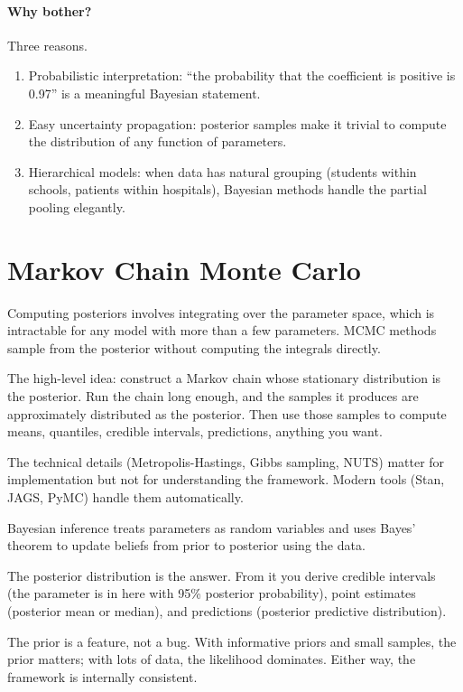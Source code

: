 \paragraph{Why bother?} Three reasons.
\begin{enumerate}[noitemsep]
\item Probabilistic interpretation: ``the probability that the coefficient is positive is 0.97'' is a meaningful Bayesian statement.
\item Easy uncertainty propagation: posterior samples make it trivial to compute the distribution of any function of parameters.
\item Hierarchical models: when data has natural grouping (students within schools, patients within hospitals), Bayesian methods handle the partial pooling elegantly.
\end{enumerate}

\section{Markov Chain Monte Carlo}

Computing posteriors involves integrating over the parameter space, which is intractable for any model with more than a few parameters. MCMC methods sample from the posterior without computing the integrals directly.

The high-level idea: construct a Markov chain whose stationary distribution is the posterior. Run the chain long enough, and the samples it produces are approximately distributed as the posterior. Then use those samples to compute means, quantiles, credible intervals, predictions, anything you want.

The technical details (Metropolis-Hastings, Gibbs sampling, NUTS) matter for implementation but not for understanding the framework. Modern tools (Stan, JAGS, PyMC) handle them automatically.

\begin{keyinsight}
Bayesian inference treats parameters as random variables and uses Bayes' theorem to update beliefs from prior to posterior using the data.

The posterior distribution is the answer. From it you derive credible intervals (the parameter is in here with 95\% posterior probability), point estimates (posterior mean or median), and predictions (posterior predictive distribution).

The prior is a feature, not a bug. With informative priors and small samples, the prior matters; with lots of data, the likelihood dominates. Either way, the framework is internally consistent.
\end{keyinsight}

